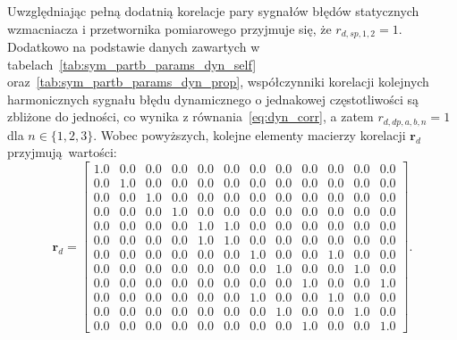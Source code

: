 Uwzględniając pełną dodatnią korelacje pary sygnałów błędów statycznych wzmacniacza i przetwornika pomiarowego przyjmuje się, że $r_{d,sp,1,2} = 1$. Dodatkowo na podstawie danych zawartych w tabelach~\ref{tab:sym_partb_params_dyn_self} oraz~\ref{tab:sym_partb_params_dyn_prop}, współczynniki korelacji kolejnych harmonicznych sygnału błędu dynamicznego o jednakowej częstotliwości są zbliżone do jedności, co wynika z równania~\eqref{eq:dyn_corr}, a zatem $r_{d,dp,a,b,n} = 1$ dla $n \in \{ 1, 2, 3 \}$. Wobec powyższych, kolejne elementy macierzy korelacji $\mathbf{r}_{d}$ przyjmują wartości:
\begin{equation}
\mathbf{r}_{d} =
\begin{bmatrix}
\num{1.0} & \num{0.0} & \num{0.0} & \num{0.0} & \num{0.0} & \num{0.0} & \num{0.0} & \num{0.0} & \num{0.0} & \num{0.0} & \num{0.0} & \num{0.0} \\
\num{0.0} & \num{1.0} & \num{0.0} & \num{0.0} & \num{0.0} & \num{0.0} & \num{0.0} & \num{0.0} & \num{0.0} & \num{0.0} & \num{0.0} & \num{0.0} \\
\num{0.0} & \num{0.0} & \num{1.0} & \num{0.0} & \num{0.0} & \num{0.0} & \num{0.0} & \num{0.0} & \num{0.0} & \num{0.0} & \num{0.0} & \num{0.0} \\
\num{0.0} & \num{0.0} & \num{0.0} & \num{1.0} & \num{0.0} & \num{0.0} & \num{0.0} & \num{0.0} & \num{0.0} & \num{0.0} & \num{0.0} & \num{0.0} \\
\num{0.0} & \num{0.0} & \num{0.0} & \num{0.0} & \num{1.0} & \num{1.0} & \num{0.0} & \num{0.0} & \num{0.0} & \num{0.0} & \num{0.0} & \num{0.0} \\
\num{0.0} & \num{0.0} & \num{0.0} & \num{0.0} & \num{1.0} & \num{1.0} & \num{0.0} & \num{0.0} & \num{0.0} & \num{0.0} & \num{0.0} & \num{0.0} \\
\num{0.0} & \num{0.0} & \num{0.0} & \num{0.0} & \num{0.0} & \num{0.0} & \num{1.0} & \num{0.0} & \num{0.0} & \num{1.0} & \num{0.0} & \num{0.0} \\
\num{0.0} & \num{0.0} & \num{0.0} & \num{0.0} & \num{0.0} & \num{0.0} & \num{0.0} & \num{1.0} & \num{0.0} & \num{0.0} & \num{1.0} & \num{0.0} \\
\num{0.0} & \num{0.0} & \num{0.0} & \num{0.0} & \num{0.0} & \num{0.0} & \num{0.0} & \num{0.0} & \num{1.0} & \num{0.0} & \num{0.0} & \num{1.0} \\
\num{0.0} & \num{0.0} & \num{0.0} & \num{0.0} & \num{0.0} & \num{0.0} & \num{1.0} & \num{0.0} & \num{0.0} & \num{1.0} & \num{0.0} & \num{0.0} \\
\num{0.0} & \num{0.0} & \num{0.0} & \num{0.0} & \num{0.0} & \num{0.0} & \num{0.0} & \num{1.0} & \num{0.0} & \num{0.0} & \num{1.0} & \num{0.0} \\
\num{0.0} & \num{0.0} & \num{0.0} & \num{0.0} & \num{0.0} & \num{0.0} & \num{0.0} & \num{0.0} & \num{1.0} & \num{0.0} & \num{0.0} & \num{1.0}
\end{bmatrix}
\label{eq:sym_partd_output_coher_list}.
\end{equation}

